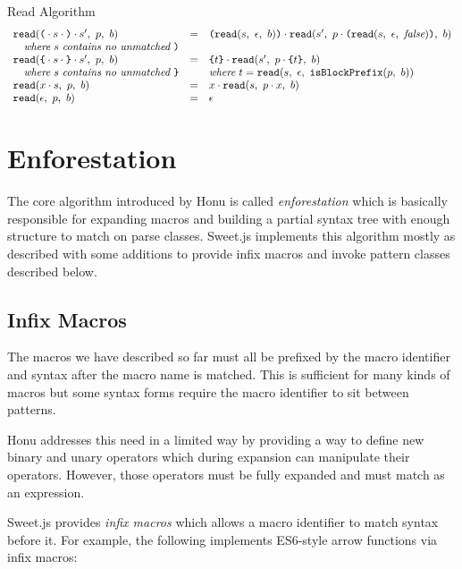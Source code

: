 \documentclass[preprint,10pt]{sigplanconf}
\begin{document}
\begin{displayfigure*}{\label{fig:read}Read Algorithm}
\[\begin{array}{lcll}
    \texttt{read}(\texttt{(} \cdot s \cdot \texttt{)} \cdot s',~p,~b)
    &=&
    \texttt{(}\texttt{read}(s,~\epsilon,~b)\texttt{)} \cdot 
      \texttt{read}(s',~p \cdot \texttt{(}\texttt{read}(s,~\epsilon,~\textit{false}) \texttt{)},~b)
    
    \\
    \quad \textit{where}~s~\textit{contains no unmatched}~\texttt{)} 
    \\
    \texttt{read}(
      \texttt{\{} \cdot s \cdot \texttt{\}} \cdot s'
    ,~p,~b)
    &=&
    \texttt{\{}t\texttt{\}} \cdot 
      \texttt{read}(s',~
        p \cdot \texttt{\{}t\texttt{\}}
      ,~b)
    
    \\
    \quad \textit{where}~s~\textit{contains no unmatched}~\texttt{\}} 
    && \textit{where}~t = \texttt{read}(s,~\epsilon,~\texttt{isBlockPrefix}(p,~b))
    \\
    \texttt{read}(x \cdot s,~p,~b)
    &=&
    x \cdot 
      \texttt{read}(s,~p \cdot x,~b)
   
    \\
    \texttt{read}(\epsilon,~p,~b)
    &=&
    \epsilon
  \end{array}
\]
\end{displayfigure*}

\section{Enforestation}
\label{sec-4}

The core algorithm introduced by Honu is called \emph{enforestation} which
is basically responsible for expanding macros and building a partial
syntax tree with enough structure to match on parse classes. Sweet.js
implements this algorithm mostly as described with some additions to
provide infix macros and invoke pattern classes described below.

\subsection{Infix Macros}
\label{sec-4-1}
The macros we have described so far must all be prefixed by the macro
identifier and syntax after the macro name is matched. This is
sufficient for many kinds of macros but some syntax forms require the
macro identifier to sit between patterns.

Honu addresses this need in a limited way by providing a way to define
new binary and unary operators which during expansion can manipulate
their operators. However, those operators must be fully expanded and
must match as an expression.

Sweet.js provides \emph{infix macros} which allows a macro identifier to
match syntax before it. For example, the following implements
ES6-style arrow functions via infix macros:
\end{document}
